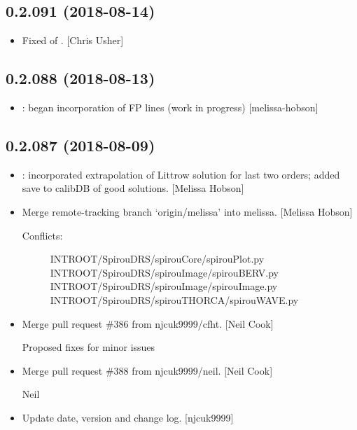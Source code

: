 \documentclass[a4paper,10pt,english]{report}
\begin{document}
\subsection{0.2.091 (2018-08-14)}
\label{\detokenize{misc/changelog:id372}}\begin{itemize}
\item {} 
Fixed  of . {[}Chris Usher{]}

\end{itemize}


\subsection{0.2.088 (2018-08-13)}
\label{\detokenize{misc/changelog:id373}}\begin{itemize}
\item {} 
: began incorporation of FP lines (work in
progress) {[}melissa-hobson{]}

\end{itemize}


\subsection{0.2.087 (2018-08-09)}
\label{\detokenize{misc/changelog:id374}}\begin{itemize}
\item {} 
: incorporated extrapolation of Littrow
solution for last two orders; added save to calibDB of good solutions.
{[}Melissa Hobson{]}

\item {} 
Merge remote-tracking branch ‘origin/melissa’ into melissa. {[}Melissa
Hobson{]}
\begin{description}
\item[{Conflicts:}] \leavevmode
INTROOT/SpirouDRS/spirouCore/spirouPlot.py
INTROOT/SpirouDRS/spirouImage/spirouBERV.py
INTROOT/SpirouDRS/spirouImage/spirouImage.py
INTROOT/SpirouDRS/spirouTHORCA/spirouWAVE.py

\end{description}

\item {} 
Merge pull request \#386 from njcuk9999/cfht. {[}Neil Cook{]}

Proposed fixes for minor issues

\item {} 
Merge pull request \#388 from njcuk9999/neil. {[}Neil Cook{]}

Neil

\item {} 
Update date, version and change log. {[}njcuk9999{]}

\end{itemize}
\end{document}
